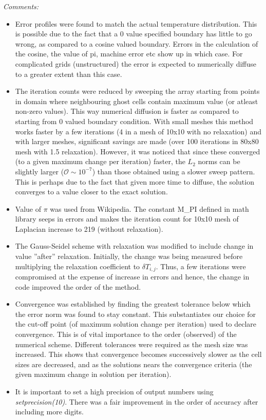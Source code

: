 \documentclass[a4paper,10pt]{article}
\begin{document}
\emph{Comments:}
\begin{itemize}
\item Error profiles were found to match the actual temperature distribution. This is possible due to the fact that a 0 value specified boundary has little to go wrong, as compared to a cosine valued boundary. Errors in the calculation of the cosine, the value of pi, machine error etc show up in which case. For complicated grids (unstructured) the error is expected to numerically diffuse to a greater extent than this case.
  \item The iteration counts were reduced by sweeping the array starting from points in domain where neighbouring ghost cells contain maximum value (or atleast non-zero values). This way numerical diffusion is faster as compared to starting from 0 valued boundary condition. With small meshes this method works faster by a few iterations (4 in a mesh of 10x10 with no relaxation) and with larger meshes, significant savings are made (over 100 iterations in 80x80 mesh with 1.5 relaxation). However, it was noticed that since these converged (to a given maximum change per iteration) faster, the $L_2$ norms can be slightly larger ($\mathcal{O} \sim 10^{-7}$) than those obtained using a slower sweep pattern. This is perhaps due to the fact that given more time to diffuse, the solution converges to a value closer to the exact solution.
  \item Value of $\pi$ was used from Wikipedia. The constant M\_PI defined in math library seeps in errors and makes the iteration count for 10x10 mesh of Laplacian increase to 219 (without relaxation).
  \item The Gauss-Seidel scheme with relaxation was modified to include change in value ''after'' relaxation. Initially, the change was being measured before multiplying the relaxation coefficient to $\delta T_{i,j}$. Thus, a few iterations were compromised at the expense of increase in errors and hence, the change in code improved the order of the method.
  \item Convergence was established by finding the greatest tolerance below which the error norm was found to stay constant. This substantiates our choice for the cut-off point (of maximum solution change per iteration) used to declare convergence. This is of vital importance to the order (observed) of the numerical scheme. Different tolerances were required as the mesh size was increased. This shows that convergence becomes successively slower as the cell sizes are decreased, and as the solutions nears the convergence criteria (the given maximum change in solution per iteration).
  \item It is important to set a high precision of output numbers using \emph{setprecision(10)}. There was a fair improvement in the order of accuracy after including more digits.
\end{itemize}
\end{document}
